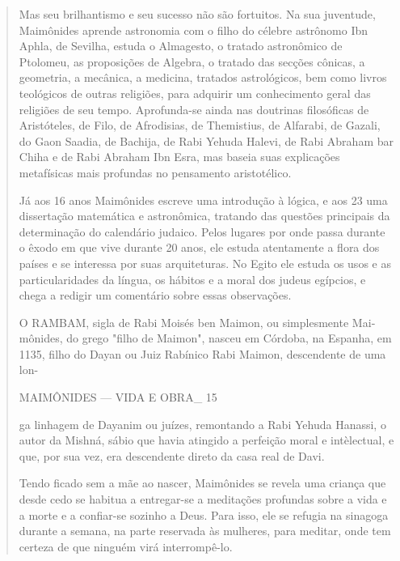 \begin{quote}
Mas seu brilhantismo e seu sucesso não são fortuitos. Na sua juven­tude,
Maimônides aprende astronomia com o filho do célebre astrônomo Ibn
Aphla, de Sevilha, estuda o Almagesto, o tratado astronômico de
Ptolomeu, as proposições de Algebra, o tratado das secções cônicas, a
geometria, a mecâni­ca, a medicina, tratados astrológicos, bem como
livros teológicos de outras re­ligiões, para adquirir um conhecimento
geral das religiões de seu tempo. Apro­funda-se ainda nas doutrinas
filosóficas de Aristóteles, de Filo, de Afrodisias, de Themistius, de
Alfarabi, de Gazali, do Gaon Saadia, de Bachija, de Rabi Ye­huda Halevi,
de Rabi Abraham bar Chiha e de Rabi Abraham Ibn Esra, mas ba­seia suas
explicações metafísicas mais profundas no pensamento aristotélico.

Já aos 16 anos Maimônides escreve uma introdução à lógica, e aos 23 uma
dissertação matemática e astronômica, tratando das questões principais
da determinação do calendário judaico. Pelos lugares por onde passa
durante o êxodo em que vive durante 20 anos, ele estuda atentamente a
flora dos países e se interessa por suas arquiteturas. No Egito ele
estuda os usos e as particulari­dades da língua, os hábitos e a moral
dos judeus egípcios, e chega a redigir um comentário sobre essas
observações.

O RAMBAM, sigla de Rabi Moisés ben Maimon, ou simplesmente Mai­mônides,
do grego "filho de Maimon", nasceu em Córdoba, na Espanha, em 1135,
filho do Dayan ou Juiz Rabínico Rabi Maimon, descendente de uma lon-

MAIMÔNIDES --- VIDA E OBRA\_ 15

ga linhagem de Dayanim ou juízes, remontando a Rabi Yehuda Hanassi, o
autor da Mishná, sábio que havia atingido a perfeição moral e
intèlectual, e que, por sua vez, era descendente direto da casa real de
Davi.

Tendo ficado sem a mãe ao nascer, Maimônides se revela uma crian­ça que
desde cedo se habitua a entregar-se a meditações profundas sobre a vida
e a morte e a confiar-se sozinho a Deus. Para isso, ele se refugia na
sinagoga durante a semana, na parte reservada às mulheres, para meditar,
onde tem cer­teza de que ninguém virá interrompê-lo.


\end{quote}
